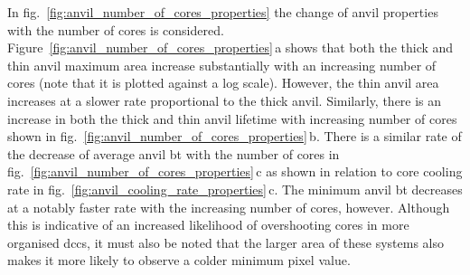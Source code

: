 In fig.~\ref{fig:anvil_number_of_cores_properties} the change of anvil properties with the number of cores is considered.
Figure~\ref{fig:anvil_number_of_cores_properties}\,a shows that both the thick and thin anvil maximum area increase substantially with an increasing number of cores (note that it is plotted against a log scale).
However, the thin anvil area increases at a slower rate proportional to the thick anvil.
Similarly, there is an increase in both the thick and thin anvil lifetime with increasing number of cores shown in fig.~\ref{fig:anvil_number_of_cores_properties}\,b.
There is a similar rate of the decrease of average anvil \acrshort{bt} with the number of cores in fig.~\ref{fig:anvil_number_of_cores_properties}\,c as shown in relation to core cooling rate in fig.~\ref{fig:anvil_cooling_rate_properties}\,c.
The minimum anvil \acrshort{bt} decreases at a notably faster rate with the increasing number of cores, however.
Although this is indicative of an increased likelihood of overshooting cores in more organised \acrshort{dcc}s, it must also be noted that the larger area of these systems also makes it more likely to observe a colder minimum pixel value.
